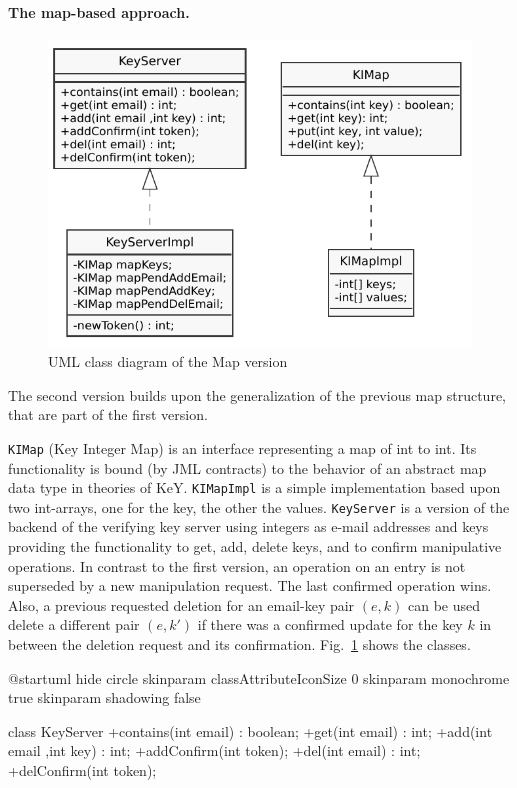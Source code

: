 \documentclass{llncs}
\begin{document}
\paragraph{The map-based approach.}

\begin{figure}
  \centering
  \includegraphics[width=.5\textwidth]{uml}
  \caption{UML class diagram of the Map version}
  \label{fig:umlclassdiagram}
\end{figure}
%
The second version builds upon the generalization of the previous map structure,
that are part of the first version.

\texttt{KIMap} (Key Integer Map) is an interface representing a map of int to
int. Its functionality is bound (by JML contracts) to the behavior of an
abstract map data type in theories of KeY. \texttt{KIMapImpl} is a simple
implementation based upon two int-arrays, one for the key, the other the values.
%
\texttt{KeyServer} is a version of the backend of the verifying key server using
integers as e-mail addresses and keys providing the functionality to get, add,
delete keys, and to confirm manipulative operations.
%
In contrast to the first version, an operation on an entry is not superseded by
a new manipulation request. The last confirmed operation wins. Also, a previous
requested deletion for an email-key pair $(e,k)$ can be used delete a different
pair $(e,k')$ if there was a confirmed update for the key $k$ in between the
deletion request and its confirmation.
%
Fig.~\ref{fig:umlclassdiagram} shows the classes.


\iffalse
@startuml
hide circle
skinparam classAttributeIconSize 0
skinparam monochrome true
skinparam shadowing false

class KeyServer {
    +contains(int email) : boolean;
    +get(int email) : int;
    +add(int email ,int key) : int;
    +addConfirm(int token);
    +del(int email) : int;
    +delConfirm(int token);
}
\end{document}
